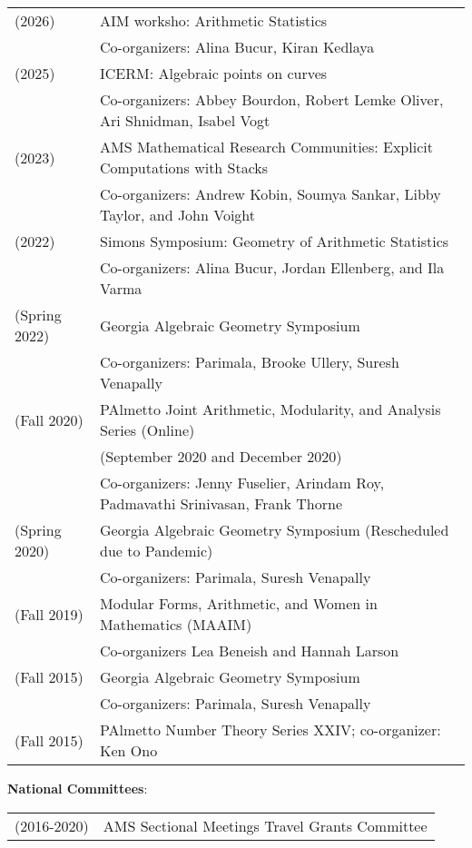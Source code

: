 \documentclass[margin,line]{res}
\newcommand{\defi}[1]{\textsf{#1}} 				%
\begin{document}
\begin{resume}
  \begin{tabular}{ll}
    (2026) & \defi{AIM worksho: Arithmetic Statistics} \\
           & Co-organizers: Alina Bucur, Kiran Kedlaya \\
    (2025) & \defi{ICERM: Algebraic points on curves} \\
           & Co-organizers: Abbey Bourdon, Robert Lemke Oliver, Ari Shnidman, Isabel Vogt \\
    (2023) & \defi{AMS Mathematical Research Communities: Explicit Computations with Stacks} \\
           & Co-organizers: Andrew Kobin, Soumya Sankar, Libby Taylor, and John Voight \\
  (2022) & \defi{Simons Symposium: Geometry of Arithmetic Statistics} \\
  & Co-organizers: Alina Bucur, Jordan Ellenberg, and Ila Varma \\    
  (Spring 2022) & \defi{Georgia Algebraic Geometry Symposium}\\
               & Co-organizers: Parimala, Brooke Ullery, Suresh Venapally   \\
  (Fall 2020) & \defi{PAlmetto Joint Arithmetic, Modularity, and Analysis Series} (Online)\\
               & (September 2020 and December 2020)\\
               & Co-organizers: Jenny Fuselier, Arindam Roy, Padmavathi Srinivasan, Frank Thorne \\
(Spring 2020) & \defi{Georgia Algebraic Geometry Symposium} (Rescheduled due to Pandemic) \\
               & Co-organizers: Parimala, Suresh Venapally   \\
  (Fall 2019) & \defi{Modular Forms, Arithmetic, and Women in Mathematics} (MAAIM) \\
               & Co-organizers Lea Beneish and Hannah Larson \\  
  (Fall 2015) & \defi{Georgia Algebraic Geometry Symposium} \\
               &  Co-organizers: Parimala, Suresh Venapally   \\
 (Fall 2015) & \defi{PAlmetto Number Theory Series XXIV}; co-organizer: Ken Ono  \\
\end{tabular}

\textbf{National Committees}: 
  \vspace*{-.15in}
  
\begin{tabular}{ll}
(2016-2020) & AMS Sectional Meetings Travel Grants Committee \\
\end{tabular}


\end{resume}
\end{document}

